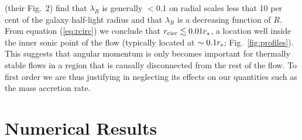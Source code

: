 \documentclass[usenatbib,fleqn]{mn2e}
\begin{document}
\citet{EmsellemCappellari+:2007a} (their Fig.~2) find that $\lambda_R$ is generally $< 0.1$ on radial scales less that 10 per cent of the galaxy half-light radius and that $\lambda_R$ is a decreasing function of $R$.  From equation (\ref{eq:rcirc}) we conclude that $r_{\rm circ} \lesssim 0.01r_{s}$, a location well inside the inner sonic point of the flow (typically located at $\sim 0.1r_{\rm s}$; Fig.~\ref{fig:profiles}).  This suggests that angular momentum is only becomes important for thermally stable flows in a region that is causally disconnected from the rest of the flow.  To first order we are thus justifying in neglecting its effects on our quantities such as the mass accretion rate.


\section{Numerical Results}
\label{sec:numerical}
\end{document}
